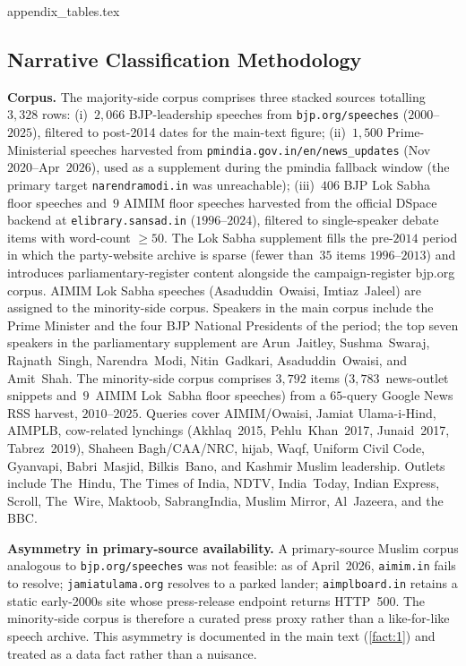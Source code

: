 \documentclass[11pt,twoside]{extarticle}
\begin{document}
{appendix_tables.tex}

\subsection{Narrative Classification Methodology} \label{app:narrative_classification}

\textbf{Corpus.} The majority-side corpus comprises three stacked sources
totalling $3{,}328$ rows: (i)~$2{,}066$ BJP-leadership speeches from
\texttt{bjp.org/speeches} ($2000$--$2025$), filtered to post-2014 dates for
the main-text figure; (ii)~$1{,}500$ Prime-Ministerial speeches harvested
from \texttt{pmindia.gov.in/en/news\_updates} (Nov~$2020$--Apr~$2026$), used
as a supplement during the pmindia fallback window (the primary target
\texttt{narendramodi.in} was unreachable); (iii)~$406$ BJP Lok Sabha floor
speeches and~$9$ AIMIM floor speeches harvested from the official DSpace
backend at \texttt{elibrary.sansad.in} ($1996$--$2024$), filtered to
single-speaker debate items with word-count $\geq 50$. The Lok Sabha
supplement fills the pre-$2014$ period in which the party-website archive
is sparse (fewer than~$35$ items $1996$--$2013$) and introduces
parliamentary-register content alongside the campaign-register bjp.org
corpus. AIMIM Lok Sabha speeches (Asaduddin~Owaisi, Imtiaz~Jaleel) are
assigned to the minority-side corpus. Speakers in the main corpus include
the Prime Minister and the four BJP National Presidents of the period; the
top seven speakers in the parliamentary supplement are Arun~Jaitley,
Sushma~Swaraj, Rajnath~Singh, Narendra~Modi, Nitin~Gadkari,
Asaduddin~Owaisi, and Amit~Shah. The minority-side corpus comprises
$3{,}792$ items ($3{,}783$~news-outlet snippets and~$9$~AIMIM Lok~Sabha
floor speeches) from a $65$-query Google News RSS harvest, $2010$--$2025$.
Queries cover AIMIM/Owaisi, Jamiat Ulama-i-Hind, AIMPLB, cow-related
lynchings (Akhlaq~2015, Pehlu~Khan~2017, Junaid~2017, Tabrez~2019), Shaheen
Bagh/CAA/NRC, hijab, Waqf, Uniform Civil Code, Gyanvapi, Babri~Masjid,
Bilkis~Bano, and Kashmir Muslim leadership. Outlets include The~Hindu, The
Times of India, NDTV, India~Today, Indian Express, Scroll, The~Wire,
Maktoob, SabrangIndia, Muslim Mirror, Al~Jazeera, and the BBC.

\textbf{Asymmetry in primary-source availability.} A primary-source Muslim
corpus analogous to \texttt{bjp.org/speeches} was not feasible: as of
April~2026, \texttt{aimim.in} fails to resolve; \texttt{jamiatulama.org}
resolves to a parked lander; \texttt{aimplboard.in} retains a static
early-2000s site whose press-release endpoint returns HTTP~500. The
minority-side corpus is therefore a curated press proxy rather than a
like-for-like speech archive. This asymmetry is documented in the main text
(\autoref{fact:1}) and treated as a data fact rather than a
nuisance.
\end{document}
